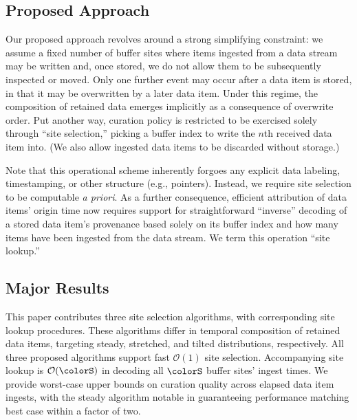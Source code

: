 \subsection{Proposed Approach}


Our proposed approach revolves around a strong simplifying constraint: we assume a fixed number of buffer sites where items ingested from a data stream may be written and, once stored, we do not allow them to be subsequently inspected or moved.
Only one further event may occur after a data item is stored, in that it may be overwritten by a later data item.
Under this regime, the composition of retained data emerges implicitly as a consequence of overwrite order.
Put another way, curation policy is restricted to be exercised solely through ``site selection,'' picking a buffer index to write the $n$th received data item into.
(We also allow ingested data items to be discarded without storage.)

Note that this operational scheme inherently forgoes any explicit data labeling, timestamping, or other structure (e.g., pointers).
Instead, we require site selection to be computable \textit{a priori}.
As a further consequence, efficient attribution of data items' origin time now requires support for straightforward ``inverse'' decoding of a stored data item's provenance based solely on its buffer index and how many items have been ingested from the data stream.
We term this operation ``site lookup.''

\subsection{Major Results}

This paper contributes three site selection algorithms, with corresponding site lookup procedures.
These algorithms differ in temporal composition of retained data items, targeting steady, stretched, and tilted distributions, respectively.
All three proposed algorithms support fast $\mathcal{O}(1)$ site selection.
Accompanying site lookup is $\mathcal{O}(\colorS)$ in decoding all $\colorS$ buffer sites' ingest times.
We provide worst-case upper bounds on curation quality across elapsed data item ingests, with the steady algorithm notable in guaranteeing performance matching best case within a factor of two.
